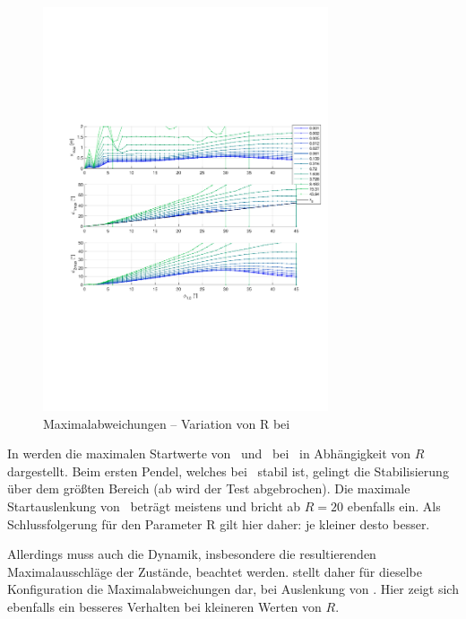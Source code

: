 \begin{figure}[htb]
	\centering
		\includegraphics[width=0.75\textwidth]{Bilder/QRVariation/ap2/R phi1 m.pdf}
	\caption{Maximalabweichungen -- Variation von R bei \apz}
	\label{fig:qrap2Rm}
\end{figure}

In  werden die maximalen Startwerte von \phe\ und \phz\ bei \apz\ in Abhängigkeit von $R$ dargestellt.
Beim ersten Pendel, welches bei \apz\ stabil ist, gelingt die Stabilisierung über dem größten Bereich (ab  wird der Test abgebrochen).
Die maximale Startauslenkung von \phz\ beträgt meistens  und bricht ab $R=20$ ebenfalls ein.
Als Schlussfolgerung für den Parameter R gilt hier daher: je kleiner desto besser.

Allerdings muss auch die Dynamik, insbesondere die resultierenden Maximalausschläge der Zustände, beachtet werden.
 stellt daher für dieselbe Konfiguration die Maximalabweichungen dar, bei Auslenkung von \phe.
Hier zeigt sich ebenfalls ein besseres Verhalten bei kleineren Werten von $R$.


